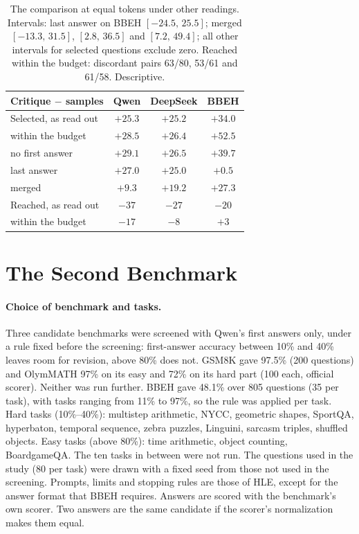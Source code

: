 \documentclass[11pt]{article}
\newcommand{\ds}{DeepSeek}
\newcommand{\qw}{Qwen}
\newcommand{\ci}[2]{$[#1,\,#2]$}
\begin{document}
\begin{table}[h]
\centering
\small
\setlength{\tabcolsep}{2.2pt}
\begin{tabular}{@{}l ccc@{}}
\toprule
Critique $-$ samples & \qw & \ds & BBEH \\
\midrule
Selected, as read out & $+25.3$ & $+25.2$ & $+34.0$ \\
\quad within the budget & $+28.5$ & $+26.4$ & $+52.5$ \\
\quad no first answer & $+29.1$ & $+26.5$ & $+39.7$ \\
\quad last answer & $+27.0$ & $+25.0$ & $+0.5$ \\
\quad merged & $+9.3$ & $+19.2$ & $+27.3$ \\
Reached, as read out & $-37$ & $-27$ & $-20$ \\
\quad within the budget & $-17$ & $-8$ & $+3$ \\
\bottomrule
\end{tabular}
\caption{The comparison at equal tokens under other readings. Intervals: last answer on BBEH \ci{-24.5}{25.5}; merged \ci{-13.3}{31.5}, \ci{2.8}{36.5} and \ci{7.2}{49.4}; all other intervals for selected questions exclude zero. Reached within the budget: discordant pairs 63/80, 53/61 and 61/58. Descriptive.}
\label{tab:supp}
\end{table}

\section{The Second Benchmark}
\label{app:bbeh}

\paragraph{Choice of benchmark and tasks.}
Three candidate benchmarks were screened with \qw's first answers only, under a rule fixed before the screening: first-answer accuracy between 10\% and 40\% leaves room for revision, above 80\% does not.
GSM8K \citep{cobbe2021gsm8k} gave 97.5\% (200 questions) and OlymMATH \citep{sun2025olymmath} 97\% on its easy and 72\% on its hard part (100 each, official scorer). Neither was run further.
BBEH gave 48.1\% over 805 questions (35 per task), with tasks ranging from 11\% to 97\%, so the rule was applied per task.
Hard tasks (10\%--40\%): multistep arithmetic, NYCC, geometric shapes, SportQA, hyperbaton, temporal sequence, zebra puzzles, Linguini, sarcasm triples, shuffled objects.
Easy tasks (above 80\%): time arithmetic, object counting, BoardgameQA.
The ten tasks in between were not run.
The questions used in the study (80 per task) were drawn with a fixed seed from those not used in the screening.
Prompts, limits and stopping rules are those of HLE, except for the answer format that BBEH requires.
Answers are scored with the benchmark's own scorer. Two answers are the same candidate if the scorer's normalization makes them equal.
\end{document}
